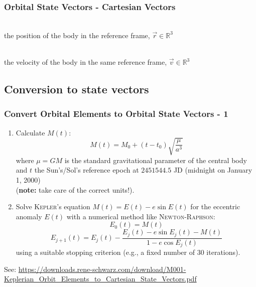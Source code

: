 \begin{frame}
    \frametitle{Orbital State Vectors - Cartesian Vectors}
    \begin{description}
        \setlength\itemsep{.5em}
        \item[{position $\vec{r}\ [\si{\au}]$}]\hfill\\\hspace*{-2cm} the position of the body in the reference frame, $\vec{r} \in \mathbb{R}^3$
        \item[{velocity $\vec{v}\ [\si{\au\per\day}]$}]\hfill\\\hspace*{-2cm} the velocity of the body in the same reference frame, $\vec{v} \in \mathbb{R}^3$
    \end{description}
\end{frame}

\subsection{Conversion to state vectors}
\begin{frame}
    \frametitle{Convert Orbital Elements to Orbital State Vectors - 1}
    \btVFill
    \begin{enumerate}
        \item Calculate $M(t)$:
        $$ M(t) = M_0 + (t - t_0) \sqrt{\frac{\mu}{a^3}} $$
        where $\mu = GM$ is the standard gravitational parameter of the central body and $t$ the Sun's/Sol's reference epoch at $2451544.5$ JD (midnight on January 1, 2000)\\
        (\textbf{note:} take care of the correct units!).
        \item Solve \textsc{Kepler}'s equation $M(t) = E(t) - e \sin{E(t)}$ for the eccentric anomaly $E(t)$ with a numerical method like \textsc{Newton-Raphson}:
        $$ E_0(t) = M(t) $$
        $$ E_{j+1}(t) = E_j(t) - \frac{E_j(t) - e \sin{E_j(t)} - M(t)}{1 - e \cos{E_j(t)}} $$
        using a suitable stopping criterion (e.g., a fixed number of \num{30} iterations).
    \end{enumerate}
    \btVFill
    \setfontsize{8pt}
    See: \url{https://downloads.rene-schwarz.com/download/M001-Keplerian_Orbit_Elements_to_Cartesian_State_Vectors.pdf}
\end{frame}

